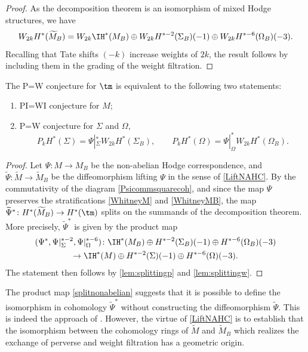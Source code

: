\begin{proof}
As the decomposition theorem is an isomorphism of mixed Hodge structures, we have
\[
W_{2k} H^*(\widetilde{M}_B)=W_{2k}\IH^*(M_B)\oplus W_{2k}H^{*-2}(\Sigma_B)(-1)\oplus W_{2k}H^{*-6}(\Omega_B)(-3).
\]
Recalling that Tate shifts $(-k)$ increase weights of $2k$, the result follows by including them in the grading of the weight filtration.
\end{proof}
\begin{thm}\label{cor:splitting}
The P=W conjecture for $\tm$ is equivalent to the following two statements:
\begin{enumerate}
\item PI=WI conjecture for $M$;
\item P=W conjecture for $\Sigma$ and $\Omega$, \ie
\[
P_{k}H^{*}(\Sigma)=\Psi|_\Sigma^* W_{2k}H^*(\Sigma_B), \qquad P_{k}H^{*}(\Omega)=\Psi|_\Omega^*W_{2k}H^*(\Omega_B).
\]
\end{enumerate}
\end{thm}
\begin{proof}
Let $\Psi\colon\! M\!\to\!M_B$ be the non-abelian Hodge correspondence, and~\hbox{$\widetilde{\Psi}\colon\! \widetilde{M}\!\to\!\widetilde{M}_B$} be the diffeomorphism lifting $\Psi$ in the sense of \cref{LiftNAHC}. By the commutativity of the diagram \eqref{Psicommsquarecoh}, and since the map $\Psi$ preserves the stratifications \eqref{WhitneyM} and \eqref{WhitneyMB}, the map $\widetilde{\Psi}^*\colon H^*(\widetilde{M}_B) \to H^*(\tm)$ splits on the summands of the decomposition theorem. More precisely, $\widetilde{\Psi}^*$ is given by the product map
\begin{multline}
(\Psi^*, \Psi|_{\Sigma}^{*-2}, \Psi|^{*-6}_{\Omega})\colon \IH^*(M_B) \oplus H^{*-2}(\Sigma_B)(-1)\oplus H^{*-6}(\Omega_B)(-3) \label{splitnonabelian}\\
\to \IH^*(M)\oplus H^{*-2}(\Sigma)(-1)\oplus H^{*-6}(\Omega)(-3).
\end{multline}
The statement then follows by \cref{lem:splittingp} and \cref{lem:splittingw}.
\end{proof}
\begin{rmk}
The product map \eqref{splitnonabelian} suggests that it is possible to define the isomorphism in cohomology $\widetilde{\Psi}^*$ without constructing the diffeomorphism $\widetilde{\Psi}$. This is indeed the approach of \cite{deCataldoHauselMigliorini2013}. However, the virtue of \cref{LiftNAHC} is to establish that the isomorphism between the cohomology rings of $\widetilde{M}$ and $\widetilde{M}_B$ which realizes the exchange of perverse and weight filtration has a geometric origin.
\end{rmk}

